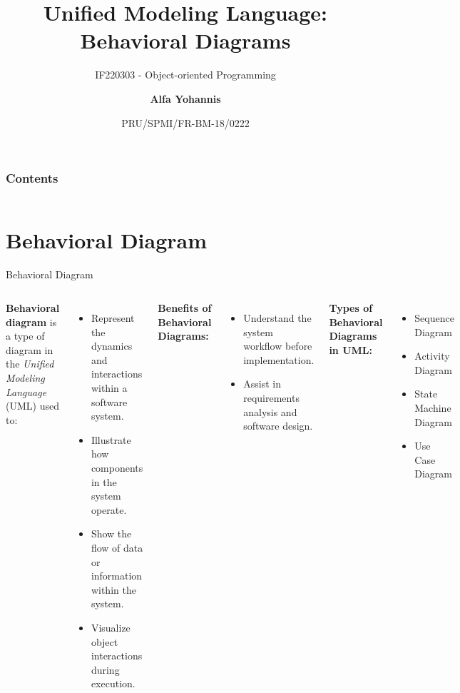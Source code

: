 \documentclass[aspectratio=169, table]{beamer}
\subtitle{IF220303 - Object-oriented Programming}
\title{\LARGE{Unified Modeling Language:}\\\LARGE{Behavioral Diagrams}\vspace{20pt}}
\date[Serial]{\scriptsize {PRU/SPMI/FR-BM-18/0222}}
\author[Pradita]{\small {\textbf{Alfa Yohannis}}}
\begin{document}
\frame{\titlepage}

\begin{frame}[fragile]
\frametitle{Contents}
\vspace{10pt}
\begin{columns}[t]
	\tableofcontents[sections={1-5}]
	
	\tableofcontents[sections={6-10}]
\end{columns}
\end{frame}

\section{Behavioral Diagram}

\begin{frame}[fragile]{Behavioral Diagram}
	\vspace{20pt}
	\begin{columns}[t]
		\textbf{Behavioral diagram} is a type of diagram in the \textit{Unified Modeling Language} (UML) used to:
		\begin{itemize}
			\item Represent the dynamics and interactions within a software system.
			\item Illustrate how components in the system operate.
			\item Show the flow of data or information within the system.
			\item Visualize object interactions during execution.
		\end{itemize}
		
		\textbf{Benefits of Behavioral Diagrams:}
		\begin{itemize}
			\item Understand the system workflow before implementation.
			\item Assist in requirements analysis and software design.
		\end{itemize}
		
		\textbf{Types of Behavioral Diagrams in UML:}
		\begin{itemize}
			\item Sequence Diagram
			\item Activity Diagram
			\item State Machine Diagram
			\item Use Case Diagram
		\end{itemize}
	\end{columns}
\end{frame}
\end{document}
